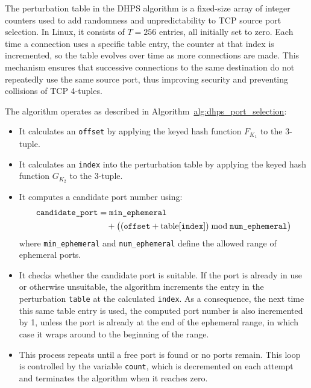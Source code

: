 \documentclass[twocolumn]{report}
\begin{document}
{The \alert{perturbation table} in the DHPS algorithm is a fixed-size array of integer counters used to add randomness and unpredictability to TCP source port selection. In Linux, it consists of $T = 256$ entries, all initially set to zero. Each time a connection uses a specific table entry, the counter at that index is incremented, so the table evolves over time as more connections are made. This mechanism ensures that successive connections to the same destination do not repeatedly use the same source port, thus improving security and preventing collisions of TCP 4-tuples.
}{}

The algorithm operates as described in Algorithm~\hyperref[1]{alg:dhps_port_selection}:
\begin{itemize}
	\item It calculates an \texttt{offset} by applying the keyed hash function \( F_{K_1} \) to the 3-tuple.
	\item It calculates an \texttt{index} into the perturbation table by applying the keyed hash function \( G_{K_2} \) to the 3-tuple.
	\item It computes a candidate port number using:
	\begin{equation*}
		\begin{split}
			\texttt{candidate\_port}
			 & = \texttt{min\_ephemeral}      \\
			 & \quad + \bigl((\texttt{offset}
			+ \text{table[{\texttt{index}}]})
			\bmod \texttt{num\_ephemeral}\bigr)
		\end{split}
	\end{equation*}
	where \texttt{min\_ephemeral} and \texttt{num\_ephemeral} define the allowed range of ephemeral ports.
	\item It checks whether the candidate port is suitable. If the port is already in use or otherwise unsuitable, the algorithm increments the entry in the perturbation \texttt{table} at the calculated \texttt{index}. As a consequence, the next time this same table entry is used, the computed port number is also \alert{incremented by 1}, unless the port is already at the end of the ephemeral range, in which case it wraps around to the beginning of the range.
	\item This process \alert{repeats until} a free port is found or no ports remain. This loop is controlled by the variable \texttt{count}, which is decremented on each attempt and terminates the algorithm when it reaches zero.
\end{itemize}

\vspace{0.2cm}

\end{document}
